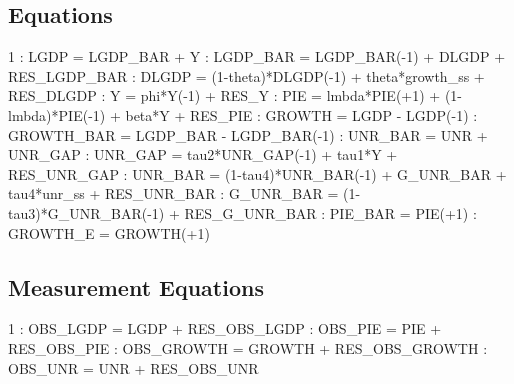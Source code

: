 \documentclass{article}%
\begin{document}
\subsection{Equations}%
\label{subsec:Equations}%
 1    :  LGDP = LGDP\_BAR + Y\newline%
    :  LGDP\_BAR = LGDP\_BAR({-}1) + DLGDP + RES\_LGDP\_BAR\newline%
    :  DLGDP = (1{-}theta)*DLGDP({-}1) + theta*growth\_ss + RES\_DLGDP\newline%
    :  Y = phi*Y({-}1) + RES\_Y\newline%
    :  PIE = lmbda*PIE(+1) + (1{-}lmbda)*PIE({-}1) + beta*Y + RES\_PIE\newline%
    :  GROWTH = LGDP {-} LGDP({-}1)\newline%
    :  GROWTH\_BAR = LGDP\_BAR {-} LGDP\_BAR({-}1)\newline%
    :  UNR\_BAR = UNR + UNR\_GAP\newline%
    :  UNR\_GAP =  tau2*UNR\_GAP({-}1) + tau1*Y + RES\_UNR\_GAP\newline%
   :  UNR\_BAR =  (1{-}tau4)*UNR\_BAR({-}1) + G\_UNR\_BAR + tau4*unr\_ss + RES\_UNR\_BAR\newline%
   :  G\_UNR\_BAR = (1{-}tau3)*G\_UNR\_BAR({-}1) + RES\_G\_UNR\_BAR\newline%
   :  PIE\_BAR = PIE(+1)\newline%
   :  GROWTH\_E = GROWTH(+1)\newline%

%
\subsection{Measurement Equations}%
\label{subsec:MeasurementEquations}%
 1    :  OBS\_LGDP = LGDP + RES\_OBS\_LGDP\newline%
    :  OBS\_PIE = PIE + RES\_OBS\_PIE\newline%
    :  OBS\_GROWTH = GROWTH + RES\_OBS\_GROWTH\newline%
    :  OBS\_UNR = UNR + RES\_OBS\_UNR\newline%
\end{document}
